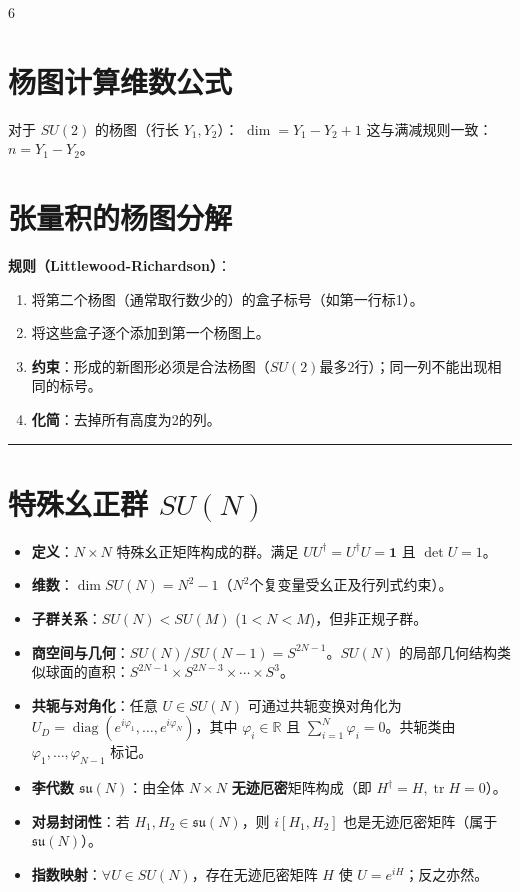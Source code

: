 \documentclass[landscape]{article}
\begin{document}
\begin{multicols*}{6}
\section*{杨图计算维数公式}
对于 $SU(2)$ 的杨图（行长 $Y_1, Y_2$）：
$\dim = Y_1 - Y_2 + 1$
这与满减规则一致：$n = Y_1 - Y_2$。

\section*{张量积的杨图分解}
\textbf{规则（Littlewood-Richardson）}：
\begin{enumerate}
    \item 将第二个杨图（通常取行数少的）的盒子标号（如第一行标1）。
    \item 将这些盒子逐个添加到第一个杨图上。
    \item \textbf{约束}：形成的新图形必须是合法杨图（$SU(2)$最多2行）；同一列不能出现相同的标号。
    \item \textbf{化简}：去掉所有高度为2的列。
\end{enumerate}
\noindent\textcolor{blue}{\rule{\linewidth}{1pt}}
\section*{特殊幺正群 $SU(N)$}
\begin{itemize}
  \item \textbf{定义}：$N \times N$ 特殊幺正矩阵构成的群。满足 $UU^{\dagger} = U^{\dagger}U = \mathbf{1}$ 且 $\det U = 1$。
  \item \textbf{维数}：$\dim SU(N) = N^2 - 1$（$N^2$个复变量受幺正及行列式约束）。
  \item \textbf{子群关系}：$SU(N) < SU(M)$ ($1 < N < M$)，但非正规子群。
  \item \textbf{商空间与几何}：$SU(N)/SU(N-1) = S^{2N-1}$。$SU(N)$ 的局部几何结构类似球面的直积：$S^{2N-1} \times S^{2N-3} \times \cdots \times S^3$。
  \item \textbf{共轭与对角化}：任意 $U \in SU(N)$ 可通过共轭变换对角化为 $U_D = \operatorname{diag}(e^{i\varphi_1}, \dots, e^{i\varphi_N})$，其中 $\varphi_i \in \mathbb{R}$ 且 $\sum_{i=1}^N \varphi_i = 0$。共轭类由 $\varphi_1, \dots, \varphi_{N-1}$ 标记。
  \item \textbf{李代数 $\mathfrak{su}(N)$}：由全体 $N \times N$ \textbf{无迹厄密}矩阵构成（即 $H^\dagger=H, \operatorname{tr}H=0$）。
  \item \textbf{对易封闭性}：若 $H_1, H_2 \in \mathfrak{su}(N)$，则 $i[H_1, H_2]$ 也是无迹厄密矩阵（属于 $\mathfrak{su}(N)$）。
  \item \textbf{指数映射}：$\forall U \in SU(N)$，存在无迹厄密矩阵 $H$ 使 $U = e^{iH}$；反之亦然。
\end{itemize}

\end{multicols*}
\end{document}
